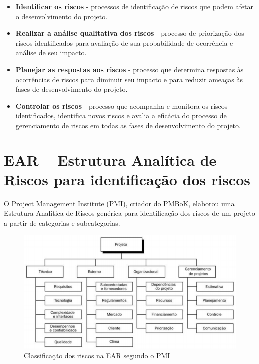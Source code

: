 \begin{itemize}
  \item \textbf{Identificar os riscos} - processos de identificação de riscos que podem afetar o desenvolvimento do projeto.
  \item \textbf{Realizar a análise qualitativa dos riscos} - processo de priorização dos riscos identificados para avaliação de sua probabilidade de ocorrência e análise de seu impacto.
  \item \textbf{Planejar as respostas aos riscos} - processo que determina respostas às ocorrências de riscos para diminuir seu impacto e para reduzir ameaças às fases de desenvolvimento do projeto.
  \item \textbf{Controlar os riscos} - processo que acompanha e monitora os riscos identificados, identifica novos riscos e avalia a eficácia do processo de gerenciamento de riscos em todas as fases de desenvolvimento do projeto.
\end{itemize}

\section*{EAR – Estrutura Analítica de Riscos para identificação dos riscos}

  O Project Management Institute (PMI), criador do PMBoK, elaborou uma Estrutura Analítica de Riscos genérica para identificação dos riscos de um projeto a partir de categorias e subcategorias.
  \begin{figure}[h]
    \label{fig:ear_padrao}
    \begin{center}
    \includegraphics[scale=0.65]{figuras/ear_padrao.png}
    \end{center}
    \caption{Classificação dos riscos na EAR segundo o PMI}
  \end{figure}

